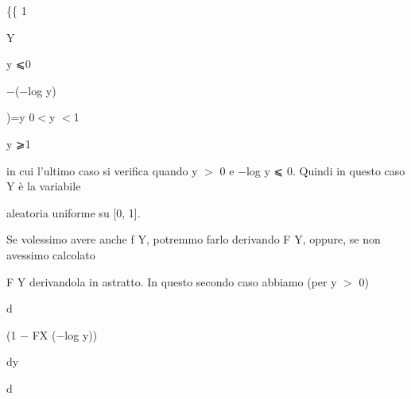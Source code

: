 \documentclass[a4paper,portrait,12pt]{article}
\begin{document}
\{\{ 1


\begin{flushleft}
Y
\end{flushleft}





\begin{flushleft}
y ⩽0
\end{flushleft}


\begin{flushleft}
$-$($-$log y)
\end{flushleft}





\begin{flushleft}
)=y 0$<$y $<$1
\end{flushleft}


\begin{flushleft}
y ⩾1
\end{flushleft}





\begin{flushleft}
in cui l'ultimo caso si verifica quando y $>$ 0 e $-$log y ⩽ 0. Quindi in questo caso Y \`{e} la variabile
\end{flushleft}


\begin{flushleft}
aleatoria uniforme su [0, 1].
\end{flushleft}


\begin{flushleft}
Se volessimo avere anche f Y, potremmo farlo derivando F Y, oppure, se non avessimo calcolato
\end{flushleft}


\begin{flushleft}
F Y derivandola in astratto. In questo secondo caso abbiamo (per y $>$ 0)
\end{flushleft}


\begin{flushleft}
d
\end{flushleft}


\begin{flushleft}
(1 $-$ FX ($-$log y))
\end{flushleft}


\begin{flushleft}
dy
\end{flushleft}


\begin{flushleft}
d
\end{flushleft}
\end{document}
